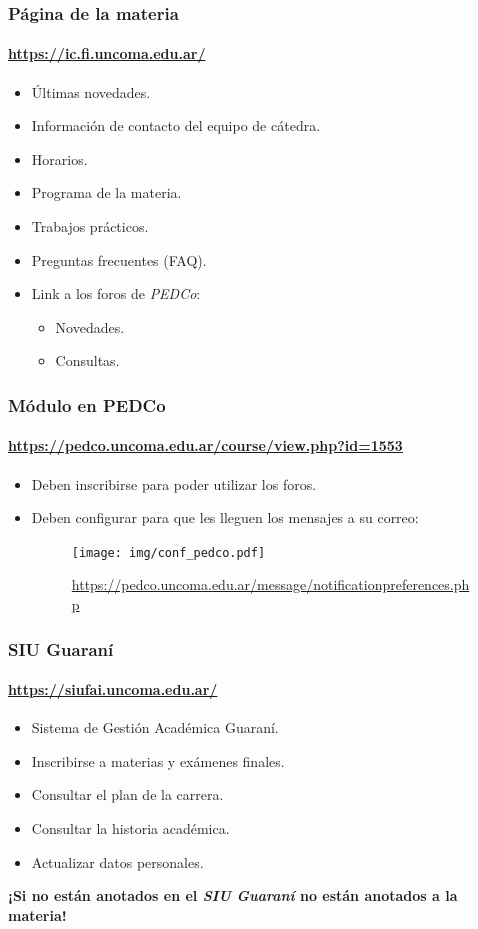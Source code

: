 \documentclass[11pt,a4paper,spanish]{beamer}
\begin{document}
\begin{frame}

    \frametitle{Página de la materia}
    \framesubtitle{\url{https://ic.fi.uncoma.edu.ar/}}

\begin{itemize}
    \item Últimas novedades.
    \item Información de contacto del equipo de cátedra.
    \item Horarios.
    \item Programa de la materia.
    \item Trabajos prácticos.
    \item Preguntas frecuentes (FAQ).
    \item Link a los foros de \emph{PEDCo}:
        \begin{itemize}
            \item Novedades.
            \item Consultas.
        \end{itemize}
\end{itemize}

\end{frame}

\begin{frame}

    \frametitle{Módulo en PEDCo}
    \framesubtitle{\url{https://pedco.uncoma.edu.ar/course/view.php?id=1553}}

\begin{itemize}
    \item Deben inscribirse para poder utilizar los foros.
    \item Deben configurar para que les lleguen los mensajes a su correo:
    \begin{figure}
        \texttt{[image: img/conf\_pedco.pdf]}
        \captionsetup{textfont=tiny,labelformat=empty}
        \caption{\url{https://pedco.uncoma.edu.ar/message/notificationpreferences.php}}
    \end{figure}
\end{itemize}

\end{frame}

\begin{frame}

    \frametitle{SIU Guaraní}
    \framesubtitle{\url{https://siufai.uncoma.edu.ar/}}

\begin{itemize}
    \item Sistema de Gestión Académica Guaraní.
    \item Inscribirse a materias y exámenes finales.
    \item Consultar el plan de la carrera.
    \item Consultar la historia académica.
    \item Actualizar datos personales.
\end{itemize}

\textbf{¡Si no están anotados en el \emph{SIU Guaraní} no están anotados a la
    materia!}

\end{frame}
\end{document}
